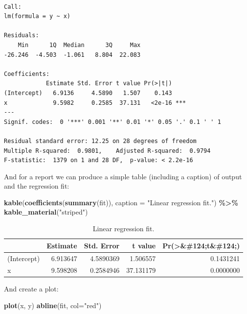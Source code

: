 \documentclass[
]{article}
\newenvironment{Shaded}{\begin{snugshade}}{\end{snugshade}}
\newcommand{\AttributeTok}[1]{\textcolor[rgb]{0.13,0.29,0.53}{#1}}
\newcommand{\FunctionTok}[1]{\textcolor[rgb]{0.13,0.29,0.53}{\textbf{#1}}}
\newcommand{\NormalTok}[1]{#1}
\newcommand{\SpecialCharTok}[1]{\textcolor[rgb]{0.81,0.36,0.00}{\textbf{#1}}}
\newcommand{\StringTok}[1]{\textcolor[rgb]{0.31,0.60,0.02}{#1}}
\begin{document}
\begin{verbatim}

Call:
lm(formula = y ~ x)

Residuals:
    Min      1Q  Median      3Q     Max 
-26.246  -4.503  -1.061   8.804  22.083 

Coefficients:
            Estimate Std. Error t value Pr(>|t|)    
(Intercept)   6.9136     4.5890   1.507    0.143    
x             9.5982     0.2585  37.131   <2e-16 ***
---
Signif. codes:  0 '***' 0.001 '**' 0.01 '*' 0.05 '.' 0.1 ' ' 1

Residual standard error: 12.25 on 28 degrees of freedom
Multiple R-squared:  0.9801,    Adjusted R-squared:  0.9794 
F-statistic:  1379 on 1 and 28 DF,  p-value: < 2.2e-16
\end{verbatim}

And for a report we can produce a simple table (including a caption) of
output and the regression fit:

\begin{Shaded}
\begin{Highlighting}[]
\FunctionTok{kable}\NormalTok{(}\FunctionTok{coefficients}\NormalTok{(}\FunctionTok{summary}\NormalTok{(fit)),}
      \AttributeTok{caption =} \StringTok{"Linear regression fit."}\NormalTok{) }\SpecialCharTok{\%\textgreater{}\%}
  \FunctionTok{kable\_material}\NormalTok{(}\StringTok{"striped"}\NormalTok{)}
\end{Highlighting}
\end{Shaded}

\begin{longtable}[t]{lrrrr}
\caption{\label{tab:fit}Linear regression fit.}\\
\toprule
 & Estimate & Std. Error & t value & Pr(>\&\#124;t\&\#124;)\\
\midrule
(Intercept) & 6.913647 & 4.5890369 & 1.506557 & 0.1431241\\
x & 9.598208 & 0.2584946 & 37.131179 & 0.0000000\\
\bottomrule
\end{longtable}

And create a plot:

\begin{Shaded}
\begin{Highlighting}[]
\FunctionTok{plot}\NormalTok{(x, y)}
\FunctionTok{abline}\NormalTok{(fit, }\AttributeTok{col=}\StringTok{"red"}\NormalTok{)}
\end{Highlighting}
\end{Shaded}
\end{document}
